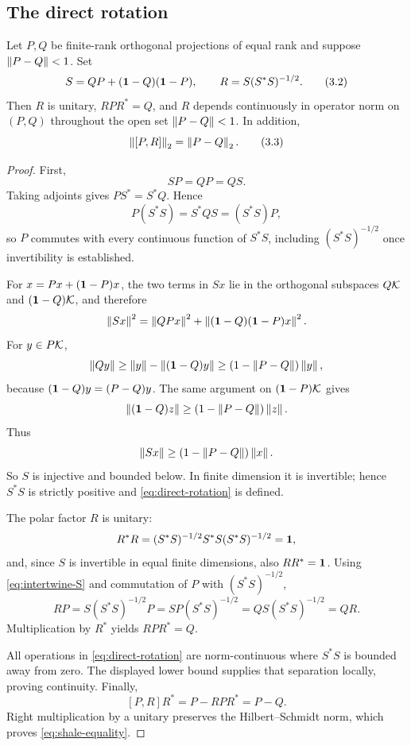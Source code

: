 \subsection{The direct rotation}

\begin{lemma}\label{lem:rotation}
Let $P,Q$ be finite-rank orthogonal projections of equal rank and suppose
$\left\lVert P-Q\right\rVert<1$.  Set
\[
 S=QP+(\mathbf 1-Q)(\mathbf 1-P),\qquad
 R=S(S^*S)^{-1/2}.
\tag{3.2}\label{eq:direct-rotation}
\]
Then $R$ is unitary, $RPR^*=Q$, and $R$ depends continuously in operator
norm on $(P,Q)$ throughout the open set $\left\lVert P-Q\right\rVert<1$.  In addition,
\[
 \left\lVert [P,R]\right\rVert_2=\left\lVert P-Q\right\rVert_2.
\tag{3.3}\label{eq:shale-equality}
\]
\end{lemma}

\begin{proof}
First,
\[
 SP=QP=QS.
\tag{3.4}\label{eq:intertwine-S}
\]
Taking adjoints gives $PS^*=S^*Q$.  Hence
\[
 P(S^*S)=S^*QS=(S^*S)P,
\]
so $P$ commutes with every continuous function of $S^*S$, including
$(S^*S)^{-1/2}$ once invertibility is established.

For $x=Px+(\mathbf 1-P)x$, the two terms in $Sx$ lie in the orthogonal
subspaces $Q\mathcal K$ and $(\mathbf 1-Q)\mathcal K$, and therefore
\[
 \left\lVert Sx\right\rVert^2
 =\left\lVert QPx\right\rVert^2+\left\lVert (\mathbf 1-Q)(\mathbf 1-P)x\right\rVert^2.
\]
For $y\in P\mathcal K$,
\[
 \left\lVert Qy\right\rVert\ge \left\lVert y\right\rVert-\left\lVert (\mathbf 1-Q)y\right\rVert
 \ge (1-\left\lVert P-Q\right\rVert)\left\lVert y\right\rVert,
\]
because $(\mathbf 1-Q)y=(P-Q)y$.  The same argument on $(\mathbf 1-P)\mathcal K$ gives
\[
 \left\lVert (\mathbf 1-Q)z\right\rVert\ge(1-\left\lVert P-Q\right\rVert)\left\lVert z\right\rVert.
\]
Thus
\[
 \left\lVert Sx\right\rVert\ge(1-\left\lVert P-Q\right\rVert)\left\lVert x\right\rVert.
\]
So $S$ is injective and bounded below.  In finite dimension it is
invertible; hence $S^*S$ is strictly positive and
\eqref{eq:direct-rotation} is defined.

The polar factor $R$ is unitary:
\[
 R^*R=(S^*S)^{-1/2}S^*S(S^*S)^{-1/2}=\mathbf 1,
\]
and, since $S$ is invertible in equal finite dimensions, also $RR^*=\mathbf 1$.
Using \eqref{eq:intertwine-S} and commutation of $P$ with
$(S^*S)^{-1/2}$,
\[
 RP=S(S^*S)^{-1/2}P
 =SP(S^*S)^{-1/2}
 =QS(S^*S)^{-1/2}=QR.
\]
Multiplication by $R^*$ yields $RPR^*=Q$.

All operations in \eqref{eq:direct-rotation} are norm-continuous where
$S^*S$ is bounded away from zero.  The displayed lower bound supplies
that separation locally, proving continuity.  Finally,
\[
 [P,R]R^*=P-RPR^*=P-Q.
\]
Right multiplication by a unitary preserves the Hilbert--Schmidt norm,
which proves \eqref{eq:shale-equality}.
\end{proof}


